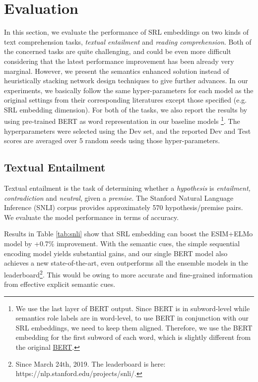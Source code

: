 \documentclass[11pt]{article}
\begin{document}
\section{Evaluation}
In this section, we evaluate the performance of SRL embeddings on two kinds of text comprehension tasks, \emph{textual entailment} and \emph{reading comprehension}. Both of the concerned tasks are quite challenging, and could be even more difficult considering that the latest performance improvement has been already very marginal. However, we present the semantics enhanced solution instead of heuristically stacking network design techniques to give further advances. In our experiments, we basically follow the same hyper-parameters for each model as the original settings from their corresponding literatures \citep{Peters2018ELMO,Chen2017Enhanced,clark2018simple} except those specified (e.g. SRL embedding dimension). For both of the tasks, we also report the results by using pre-trained BERT \citep{devlin2018bert} as word representation in our baseline models \footnote{We use the last layer of BERT output. Since BERT is in subword-level while semantics role labels are in word-level, to use BERT in conjunction with our SRL embeddings, we need to keep them aligned. Therefore, we use the BERT embedding for the first subword of each word, which is slightly different from the original \href{https://github.com/google-research/bert}{BERT}. }. The hyperparameters were selected using the Dev set, and the reported Dev and Test scores are averaged over 5 random seeds using those hyper-parameters.


\subsection{Textual Entailment} 

Textual entailment is the task of determining whether a \emph{hypothesis} is \emph{entailment, contradiction} and \emph{neutral}, given a \emph{premise}. The Stanford Natural Language Inference (SNLI) corpus \citep{Bowman2015A} provides approximately 570 hypothesis/premise pairs. We evaluate the model performance in terms of accuracy.

Results in Table \ref{tab:snli} show that SRL embedding can boost the ESIM+ELMo model by +0.7\% improvement. With the semantic cues, the simple sequential encoding model yields substantial gains, and our single BERT model also achieves a new state-of-the-art, even outperforms all the ensemble models in the leaderboard\footnote{Since March 24th, 2019. The leaderboard is here: https://nlp.stanford.edu/projects/snli/. }. This would be owing to more accurate and fine-grained information from effective explicit semantic cues.
\end{document}
